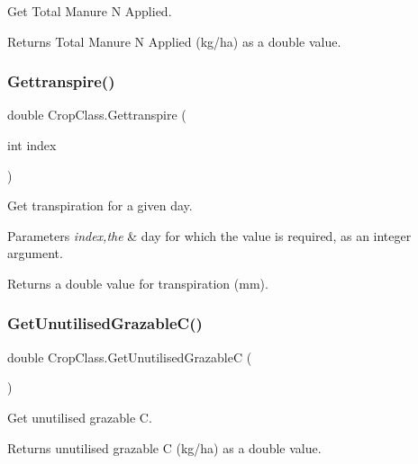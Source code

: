 Get Total Manure N Applied. 

\begin{DoxyReturn}{Returns}
Total Manure N Applied (kg/ha) as a double value. 
\end{DoxyReturn}
\mbox{\label{class_crop_class_aaa3b576e74eddfc0e6a4c555885b5764}} 
\subsubsection{\texorpdfstring{Gettranspire()}{Gettranspire()}}
{\footnotesize\ttfamily double Crop\+Class.\+Gettranspire (\begin{DoxyParamCaption}\item[{int}]{index }\end{DoxyParamCaption})\hspace{0.3cm}{\ttfamily [inline]}}



Get transpiration for a given day. 


\begin{DoxyParams}{Parameters}
{\em index,the} & day for which the value is required, as an integer argument. \\
\hline
\end{DoxyParams}
\begin{DoxyReturn}{Returns}
a double value for transpiration (mm). 
\end{DoxyReturn}
\mbox{\label{class_crop_class_a8a5911a8000ecbdb845a82a713f8e180}} 
\subsubsection{\texorpdfstring{GetUnutilisedGrazableC()}{GetUnutilisedGrazableC()}}
{\footnotesize\ttfamily double Crop\+Class.\+Get\+Unutilised\+GrazableC (\begin{DoxyParamCaption}{ }\end{DoxyParamCaption})\hspace{0.3cm}{\ttfamily [inline]}}



Get unutilised grazable C. 

\begin{DoxyReturn}{Returns}
unutilised grazable C (kg/ha) as a double value. 
\end{DoxyReturn}
\mbox{\label{class_crop_class_aae0797ff82a979470799b565c299ba77}} 
